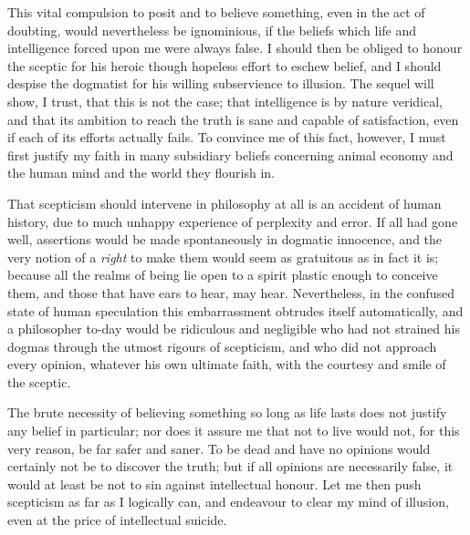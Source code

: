 This vital compulsion to posit and to believe something, even in the
act of doubting, would nevertheless be ignominious, if the beliefs
which life and intelligence forced upon me were always false. I should
then be obliged to honour the sceptic for his heroic though hopeless
effort to eschew belief, and I should despise the dogmatist for his
willing subservience to illusion. The sequel will show, I trust, that
this is not the case; that intelligence is by nature veridical, and
that its ambition to reach the truth is sane and capable of
satisfaction, even if each of its efforts actually fails. To convince
me of this fact, however, I must first justify my faith in many
subsidiary beliefs concerning animal economy and the human mind and
the world they flourish in.

That scepticism should intervene in philosophy at all is an accident
of human history, due to much unhappy experience of perplexity and
error. If all had gone well, assertions would be made spontaneously in
dogmatic innocence, and the very notion of a \textit{right} to make
them would seem as gratuitous as in fact it is; because all the realms
of being lie open to a spirit plastic enough to conceive them, and
those that have ears to hear, may hear. Nevertheless, in the confused
state of human speculation this embarrassment obtrudes itself
automatically, and a philosopher to-day would be ridiculous and
negligible who had not strained his dogmas through the utmost rigours
of scepticism, and who did not approach every opinion, whatever his
own ultimate faith, with the courtesy and smile of the sceptic.

The brute necessity of believing something so long  as life
lasts does not justify any belief in particular; nor does it assure me
that not to live would not, for this very reason, be far safer and
saner. To be dead and have no opinions would certainly not be to
discover the truth; but if all opinions are necessarily false, it
would at least be not to sin against intellectual honour. Let me then
push scepticism as far as I logically can, and endeavour to clear my
mind of illusion, even at the price of intellectual suicide.


